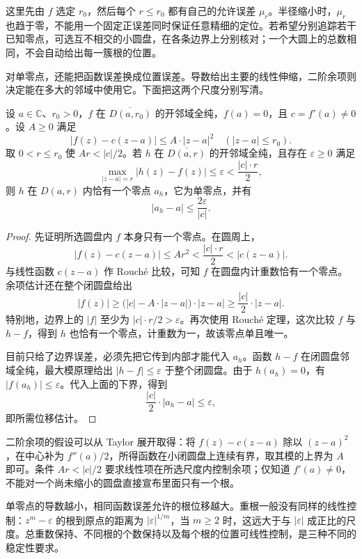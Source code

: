 这里先由 \(f\) 选定 \(r_0\)，然后每个 \(r\le r_0\) 都有自己的允许误差 \(\mu_r\)。半径缩小时，\(\mu_r\) 也趋于零，不能用一个固定正误差同时保证任意精细的定位。若希望分别追踪若干已知零点，可选互不相交的小圆盘，在各条边界上分别核对；一个大圆上的总数相同，不会自动给出每一簇根的位置。

\ProseParagraphBreak

对单零点，还能把函数误差换成位置误差。导数给出主要的线性伸缩，二阶余项则决定能在多大的邻域中使用它。下面把这两个尺度分别写清。

\begin{proposition}[单零点的位移估计]\label{b3:prop:03-simple-zero-displacement}
设 \(a\in\mathbb C\)、\(r_0>0\)，\(f\) 在 \(\overline{D(a,r_0)}\) 的开邻域全纯，\(f(a)=0\)，且 \(c=f'(a)\ne0\)。设 \(A\ge0\) 满足
\[
 |f(z)-c(z-a)|\le A\cdot|z-a|^2
 \quad(|z-a|\le r_0).
\]
取 \(0<r\le r_0\) 使 \(Ar<|c|/2\)。若 \(h\) 在 \(\overline{D(a,r)}\) 的开邻域全纯，且存在 \(\varepsilon\ge0\) 满足
\[
 \max_{|z-a|=r}|h(z)-f(z)|\le\varepsilon
 <\frac{|c|\cdot r}{2},
\]
则 \(h\) 在 \(D(a,r)\) 内恰有一个零点 \(a_h\)，它为单零点，并有
\[
 |a_h-a|\le\frac{2\varepsilon}{|c|}.
\]
\end{proposition}
\begin{proof}
先证明所选圆盘内 \(f\) 本身只有一个零点。在圆周上，
\[
 |f(z)-c(z-a)|\le Ar^2
 <\frac{|c|\cdot r}{2}<|c(z-a)|.
\]
与线性函数 \(c(z-a)\) 作 Rouché 比较，可知 \(f\) 在圆盘内计重数恰有一个零点。余项估计还在整个闭圆盘给出
\[
 |f(z)|\ge\bigl(|c|-A\cdot|z-a|\bigr)\cdot|z-a|
 \ge\frac{|c|}{2}\cdot|z-a|.
\]
特别地，边界上的 \(|f|\) 至少为 \(|c|\cdot r/2>\varepsilon\)。再次使用 Rouché 定理，这次比较 \(f\) 与 \(h-f\)，得到 \(h\) 也恰有一个零点，计重数为一，故该零点单且唯一。

目前只给了边界误差，必须先把它传到内部才能代入 \(a_h\)。函数 \(h-f\) 在闭圆盘邻域全纯，最大模原理给出 \(|h-f|\le\varepsilon\) 于整个闭圆盘。由于 \(h(a_h)=0\)，有 \(|f(a_h)|\le\varepsilon\)。代入上面的下界，得到
\[
 \frac{|c|}{2}\cdot|a_h-a|\le\varepsilon,
\]
即所需位移估计。
\end{proof}

二阶余项的假设可以从 Taylor 展开取得：将 \(f(z)-c(z-a)\) 除以 \((z-a)^2\)，在中心补为 \(f''(a)/2\)，所得函数在小闭圆盘上连续有界，取其模的上界为 \(A\) 即可。条件 \(Ar<|c|/2\) 要求线性项在所选尺度内控制余项；仅知道 \(f'(a)\ne0\)，不能对一个尚未缩小的圆盘直接宣布里面只有一个根。

\ProseParagraphBreak

单零点的导数越小，相同函数误差允许的根位移越大。重根一般没有同样的线性控制：\(z^m-\varepsilon\) 的根到原点的距离为 \(|\varepsilon|^{1/m}\)，当 \(m\ge2\) 时，这远大于与 \(|\varepsilon|\) 成正比的尺度。总重数保持、不同根的个数保持以及每个根的位置可线性控制，是三种不同的稳定性要求。

